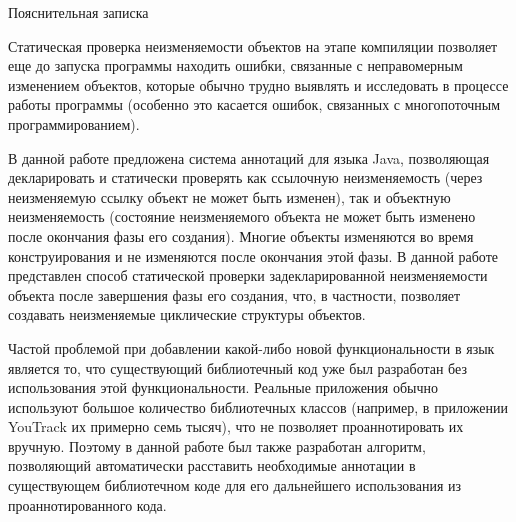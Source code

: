 \documentclass[a4paper,14pt]{extreport}
\begin{document}
\thispagestyle{empty}
\pagestyle{empty}

{\Large Пояснительная записка}

Статическая проверка неизменяемости объектов на этапе компиляции позволяет еще до запуска программы находить ошибки, связанные с неправомерным изменением объектов, которые обычно трудно выявлять и исследовать в процессе работы программы (особенно это касается ошибок, связанных с многопоточным программированием). 

В данной работе предложена система аннотаций для языка Java, позволяющая декларировать и статически проверять как ссылочную неизменяемость (через неизменяемую ссылку объект не может быть изменен), так и объектную неизменяемость (состояние неизменяемого объекта не может быть изменено после окончания фазы его создания). Многие объекты изменяются во время конструирования и не изменяются после окончания этой фазы. В данной работе представлен способ статической проверки задекларированной неизменяемости объекта после завершения фазы его создания, что, в частности, позволяет создавать неизменяемые циклические структуры объектов.

Частой проблемой при добавлении какой-либо новой функциональности в язык является то, что существующий библиотечный код уже был разработан без использования этой функциональности. Реальные приложения обычно используют большое количество библиотечных классов (например, в приложении YouTrack их примерно семь тысяч), что не позволяет проаннотировать их вручную. Поэтому в данной работе был также разработан алгоритм, позволяющий автоматически расставить необходимые аннотации в существующем библиотечном коде для его дальнейшего использования из проаннотированного кода.
\end{document}
